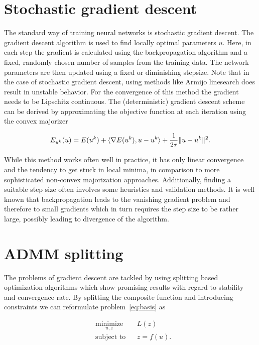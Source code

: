 \documentclass[english,11pt,a4paper]{article}
\begin{document}
\section{Stochastic gradient descent}

The standard way of training neural networks is stochastic gradient descent. The gradient descent algorithm is used to find locally optimal parameters $u$. Here, in each step the gradient is calculated using the backpropagation algorithm and a fixed, randomly chosen number of samples from the training data. The network parameters are then updated using a fixed or diminishing stepsize. Note that in the case of stochastic gradient descent, using methods like Armijo linesearch does result in unstable behavior. For the convergence of this method the gradient needs to be Lipschitz continuous. The (deterministic) gradient descent scheme can be derived by approximating the objective function at each iteration using the convex majorizer

\begin{equation}
	E_{u^k}(u) = E(u^k) + \langle \nabla E(u^k), u - u^k \rangle + \frac{1}{2 \tau} \|u - u^k\|^2.
	\label{eq:gd_majorizer}
\end{equation}


While this method works often well in practice, it has only linear convergence and the tendency to get stuck in local minima, in comparison to more sophisticated non-convex majorization approaches. Additionally, finding a suitable step size often involves some heuristics and validation methods. It is well known that backpropagation leads to the vanishing gradient problem and therefore to small gradients which in turn requires the step size to be rather large, possibly leading to divergence of the algorithm.

\section{ADMM splitting}
\label{sec:last-layer_splitting}

The problems of gradient descent are tackled by using splitting based optimization algorithms \cites{carreira2014distributed}{taylor2016training} which show promising results with regard to stability and convergence rate. By splitting the composite function and introducing constraints we can reformulate problem~\ref{eq:basis} as

\begin{equation}
	\begin{aligned}
		& \underset{u,z}{\text{minimize}}
		&& L(z) \\
		& \text{subject to}
		&& z = f(u).
	\end{aligned}
	\label{eq:last-layer_splitting_problem}
\end{equation}
\end{document}
